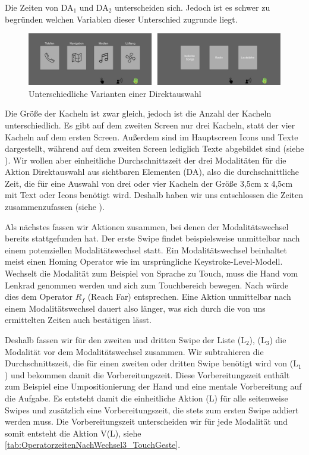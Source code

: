Die Zeiten von DA$_1$ und DA$_2$ unterscheiden sich.
Jedoch ist es schwer zu begründen welchen Variablen dieser Unterschied zugrunde liegt.
\begin{figure}
	\centering
		\includegraphics[width=1\textwidth]{img/Screen1vsScreen2.JPG}
	\caption{Unterschiedliche Varianten einer Direktauswahl}
	\label{fig:Screen1vsScreen2}
\end{figure}
Die Größe der Kacheln ist zwar gleich, jedoch ist die Anzahl der Kacheln unterschiedlich.
Es gibt auf dem zweiten Screen nur drei Kacheln, statt der vier Kacheln auf dem ersten Screen.
Außerdem sind im Hauptscreen Icons und Texte dargestellt, während auf dem zweiten Screen lediglich Texte abgebildet sind (siehe ).
Wir wollen aber einheitliche Durchschnittszeit der drei Modalitäten für die Aktion Direktauswahl aus sichtbaren Elementen (DA), also die durchschnittliche Zeit, die für eine Auswahl von drei oder vier Kacheln der Größe 3,5cm x 4,5cm mit Text oder Icons benötigt wird.
Deshalb haben wir uns entschlossen die Zeiten zusammenzufassen (siehe ).

Als nächstes fassen wir Aktionen zusammen, bei denen der Modalitätswechsel bereits stattgefunden hat.
Der erste Swipe findet beispielsweise unmittelbar nach einem potenziellen Modalitätswechsel statt.
Ein Modalitätswechsel beinhaltet meist einen Homing Operator wie im ursprüngliche Keystroke-Level-Modell.
Wechselt die Modalität zum Beispiel von Sprache zu Touch, muss die Hand vom Lenkrad genommen werden und sich zum Touchbereich bewegen.
Nach \citet{Green_2002} würde dies dem Operator $R_f$ (Reach Far) entsprechen.
Eine Aktion unmittelbar nach einem Modalitätswechsel dauert also länger, was sich durch die von uns ermittelten Zeiten auch bestätigen lässt.

Deshalb fassen wir für den zweiten und dritten Swipe der Liste (L$_2$), (L$_3$) die Modalität vor dem Modalitätswechsel zusammen.
Wir subtrahieren die Durchschnittszeit, die für einen zweiten oder dritten Swipe benötigt wird von (L$_1$) und bekommen damit die Vorbereitungszeit.
Diese Vorbereitungszeit enthält zum Beispiel eine Umpositionierung der Hand und eine mentale Vorbereitung auf die Aufgabe.
Es entsteht damit die einheitliche Aktion (L) für alle seitenweise Swipes und zusätzlich eine Vorbereitungszeit, die stets zum ersten Swipe addiert werden muss.
Die Vorbereitungszeit unterscheiden wir für jede Modalität und somit entsteht die Aktion V(L), siehe \ref{tab:OperatorzeitenNachWechsel3_TouchGeste}.
 
